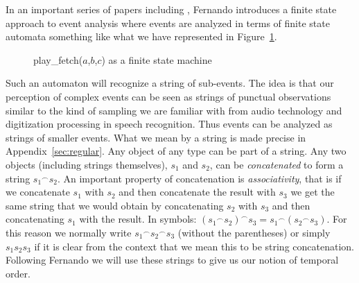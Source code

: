   

In an important series of papers including
\cite{Fernando2004,Fernando2006,Fernando2008,Fernando2009,Fernando2011}, Fernando introduces a finite state
approach to event analysis where events are analyzed in terms of
finite state automata something like what we have represented in
Figure~\ref{fig:fetch-fs}.
\begin{figure} 




\caption{play\_fetch($a$,$b$,$c$) as a finite state machine}
\label{fig:fetch-fs}
\end{figure}  
Such an automaton will recognize a string of
sub-events.  The idea is that our perception of complex events can be seen as strings of
punctual observations similar to the kind of sampling we are
familiar with from audio technology and digitization processing in
speech recognition.  Thus events can be analyzed as strings of smaller
events.  What we mean by a string is made precise in
Appendix~\ref{sec:regular}. Any object of any type can be part of a
string.  Any two objects (including strings themselves), $s_1$ and $s_2$, can be
\textit{concatenated} to form a string ${s_1}^{\frown}s_2$.  An
important property of concatenation is \textit{associativity}, that is
if we concatenate $s_1$ with $s_2$ and then concatenate the result
with $s_3$ we get the same string that we would obtain by
concatenating $s_2$ with $s_3$ and then concatenating $s_1$ with the
result.  In symbols: $({s_1}^{\frown}s_2)^{\frown}s_3 =
{s_1}^{\frown}({s_2}^{\frown}s_3)$.  For this reason we normally write
${s_1}^{\frown}{s_2}^{\frown}s_3$ (without the parentheses) or simply
$s_1s_2s_3$ if it is clear from the context that we mean this to be
string concatenation.  Following Fernando we will use these strings to
give us our notion of temporal order. 

